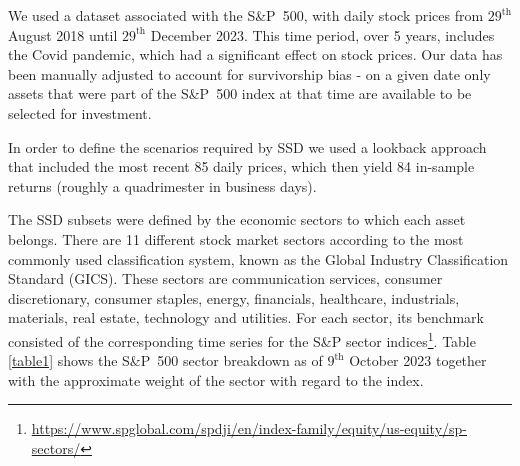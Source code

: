 We used a dataset associated with the S\&P~500, with daily stock prices  from $29^{\text{th}}$ August 2018 until $29^{\text{th}}$
 December 2023.
This time period, over 5 years,  includes the Covid pandemic, which had a significant effect on stock prices.
Our data has been manually adjusted to account for survivorship bias - on a given date only assets that 
were part of the S\&P~500 index at that time are available to be selected for investment.

In order to define the scenarios  required by SSD we used a lookback approach that included the 
most recent 85 daily prices, which then yield 84 in-sample returns (roughly a quadrimester in business days). 

The SSD subsets were defined by the economic sectors to which each asset belongs. There are 11 different stock market sectors 
according to the most commonly used classification system, known as the 
Global Industry Classification Standard (GICS). These sectors are 
communication services,
consumer discretionary,
consumer staples,
energy, 
financials,
healthcare,
industrials,
materials, 
real estate,
technology and 
utilities.
For each sector, its benchmark consisted of the corresponding time series for the S\&P sector indices\footnote{\url{https://www.spglobal.com/spdji/en/index-family/equity/us-equity/sp-sectors/}}. Table \ref{table1} shows the S\&P~500 sector breakdown as of $9^{\text{th}}$ October 2023 together with the approximate weight of the sector with regard to the index.


\begin{table}[!ht]
\centering
{\small
\renewcommand{\tabcolsep}{1mm} \renewcommand{\arraystretch}{1} \begin{tabular}{|l|c|}
\hline
{} & 
\caption{S\&P~500 sector breakdown}
\label{table1}
\end{table}

